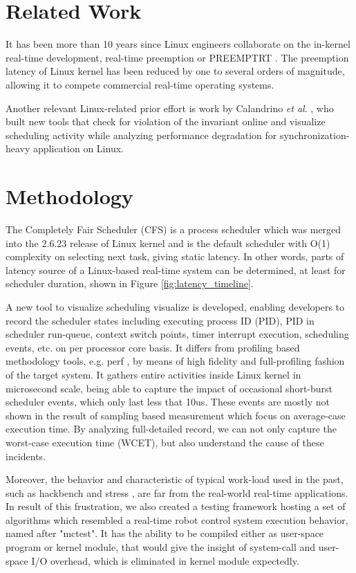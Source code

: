 \documentclass[conference]{IEEEtran}
\begin{document}
\section{Related Work}

It has been more than 10 years since Linux engineers collaborate on the in-kernel real-time development, real-time
preemption or PREEMPT\textunderscore RT \cite{rt-linux}. The preemption latency of Linux kernel has been reduced by
one to several orders of magnitude, allowing it to compete commercial real-time operating systems.

Another relevant Linux-related prior effort is work by Calandrino \textit{et al}. \cite{Lozi:2016:LSD:2901318.2901326},
who built new tools that check for violation of the invariant online and visualize scheduling activity while analyzing
performance degradation for synchronization-heavy application on Linux.

\section{Methodology}

    The Completely Fair Scheduler (CFS) is a process scheduler which was merged into the 2.6.23 release of Linux kernel
    and is the default scheduler with O(1) complexity on selecting next task, giving static latency. In other words, parts
    of latency source of a Linux-based real-time system can be determined, at least for scheduler duration, shown in
    Figure \ref{fig:latency_timeline}.

    A new tool to visualize scheduling visualize is developed, enabling developers to record the scheduler states
    including executing process ID (PID), PID in scheduler run-queue, context switch points, timer interrupt execution,
    scheduling events, etc. on per processor core basis. It differs from profiling based methodology tools, e.g.
    perf \cite{perf}, by means of high fidelity and full-profiling fashion of the target system. It gathers entire
    activities inside Linux kernel in microsecond scale, being able to capture the impact of occasional short-burst
    scheduler events, which only last less that 10us. These events are mostly not shown in the result of sampling based
    measurement which focus on average-case execution time. By analyzing full-detailed record, we can not only
    capture the worst-case execution time (WCET), but also understand the cause of these incidents.

    Moreover, the behavior and characteristic of typical work-load used in the past, such as hackbench and stress \cite{rt-tests},
    are far from the real-world real-time applications. In result of this frustration, we also created a testing framework
    hosting a set of algorithms which resembled a real-time robot control system execution behavior, named after "mctest".
    It has the ability to be compiled either as user-space program or kernel module, that would give the insight of system-call
    and user-space I/O overhead, which is eliminated in kernel module expectedly.
\end{document}
